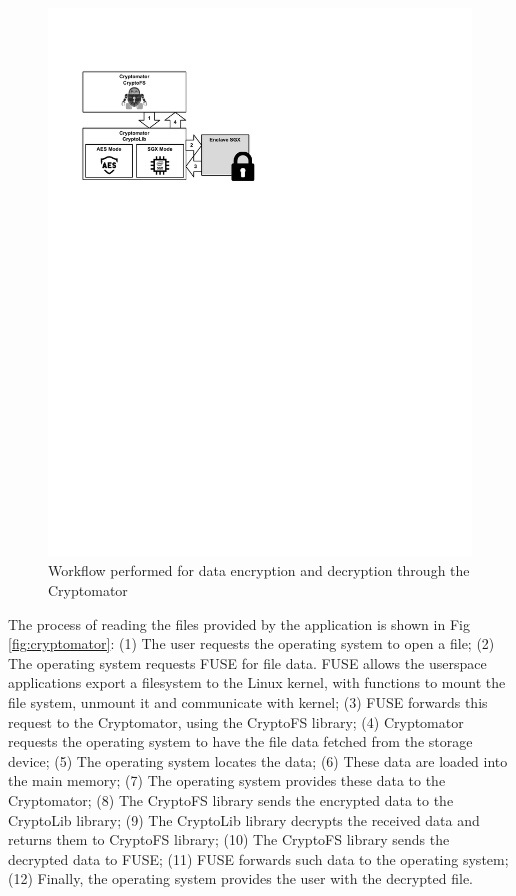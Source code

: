 \documentclass[lang=en]{sjtuarticle}
\begin{document}
\begin{figure}[h]
\begin{minipage}[b]{.45\textwidth}
        \includegraphics[width=\textwidth]{cyptofs.pdf}
        \caption{Workflow performed for data encryption and decryption through the Cryptomator}
        \label{fig:cryptofs}
    \end{minipage}
\end{figure}

The process of reading the files provided by the application
is shown in Fig \ref{fig:cryptomator}:
(1) The user requests the operating system to open a file;
(2) The operating system requests FUSE for file data. FUSE
allows the userspace applications export a filesystem
to the Linux kernel, with functions to mount the file
system, unmount it and communicate with kernel;
(3) FUSE forwards this request to the Cryptomator, using
the CryptoFS library;
(4) Cryptomator requests the operating system to have the
file data fetched from the storage device;
(5) The operating system locates the data;
(6) These data are loaded into the main memory;
(7) The operating system provides these data to the Cryptomator;
(8) The CryptoFS library sends the encrypted data to the
CryptoLib library;
(9) The CryptoLib library decrypts the received data and
returns them to CryptoFS library;
(10) The CryptoFS library sends the decrypted data to FUSE;
(11) FUSE forwards such data to the operating system;
(12) Finally, the operating system provides the user with the
decrypted file.
\end{document}
